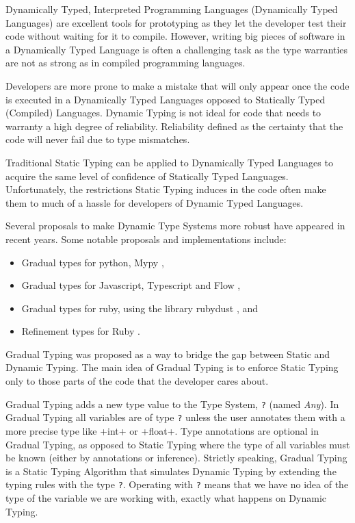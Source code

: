 Dynamically Typed, Interpreted Programming Languages (Dynamically Typed
Languages) are excellent tools for prototyping as they let the developer
test their code without waiting for it to compile. However, writing big
pieces of software in a Dynamically Typed Language is often a
challenging task as the type warranties are not as strong as in compiled
programming languages.

Developers are more prone to make a mistake that will only appear once
the code is executed in a Dynamically Typed Languages opposed to
Statically Typed (Compiled) Languages. Dynamic Typing is not ideal for
code that needs to warranty a high degree of reliability. Reliability
defined as the certainty that the code will never fail due to type
mismatches.

Traditional Static Typing can be applied to Dynamically Typed Languages
to acquire the same level of confidence of Statically Typed Languages.
Unfortunately, the restrictions Static Typing induces in the code often
make them to much of a hassle for developers of Dynamic Typed Languages.

Several proposals to make Dynamic Type Systems more robust have appeared
in recent years. Some notable proposals and implementations include:

\begin{itemize}
\tightlist
\item
  Gradual types for python, Mypy \autocite{lehtosalo2016mypy},
\item
  Gradual types for Javascript, Typescript
  \autocites{bierman2014understanding}{hejlsberg2012introducing} and
  Flow \autocite{chaudhuri2016flow},
\item
  Gradual types for ruby, using the library rubydust
  \autocite{an_dynamic_2011}, and
\item
  Refinement types for Ruby \autocite{kazerounian_refinement_2017}.
\end{itemize}

Gradual Typing \autocite{siek_gradual_2006} was proposed as a way to
bridge the gap between Static and Dynamic Typing. The main idea of
Gradual Typing is to enforce Static Typing only to those parts of the
code that the developer cares about.

Gradual Typing adds a new type value to the Type System, \texttt{?}
(named \emph{Any}). In Gradual Typing all variables are of type
\texttt{?} unless the user annotates them with a more precise type like
\pycode+int+ or \pycode+float+. Type annotations are optional in Gradual
Typing, as opposed to Static Typing where the type of all variables must
be known (either by annotations or inference). Strictly speaking,
Gradual Typing is a Static Typing Algorithm that simulates Dynamic
Typing by extending the typing rules with the type \texttt{?}. Operating
with \texttt{?} means that we have no idea of the type of the variable
we are working with, exactly what happens on Dynamic Typing.

